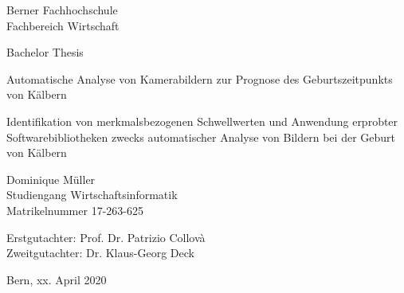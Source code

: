 
\begin{titlepage}
	
	\begin{center}

		\small{\hspace{2cm}Berner Fachhochschule\\
			\hspace{2cm}Fachbereich Wirtschaft\\}
		
		\vspace{0.75cm}
		\large{\hspace{2cm}\textrm{Bachelor Thesis }}
		\vspace{0.75cm}
		
		\Huge{\hspace{2cm} Automatische Analyse von Kamerabildern zur Prognose des Geburtszeitpunkts von Kälbern\\}
		
		\vspace{1cm}
		\LARGE{\hspace{2cm}Identifikation von merkmalsbezogenen Schwellwerten und  Anwendung erprobter Softwarebibliotheken zwecks automatischer Analyse von Bildern bei der Geburt von Kälbern   \\
		\vspace{1.75cm}	
			
			
			\LARGE{\hspace{2cm}Dominique Müller}\\
			\vspace{1cm}
			\large{\hspace{2cm}Studiengang Wirtschaftsinformatik\\
				\hspace{2cm}Matrikelnummer 17-263-625}
			
			\vspace{1cm}
			\large\hspace{2cm}Erstgutachter: Prof. Dr. Patrizio Collovà\\
			\large\hspace{2cm}Zweitgutachter: Dr. Klaus-Georg Deck\\}
			\vspace{1cm}
			
			\hspace{2cm} \large{Bern, xx. April 2020} \\

		
		
	\end{center}
	
\end{titlepage}

